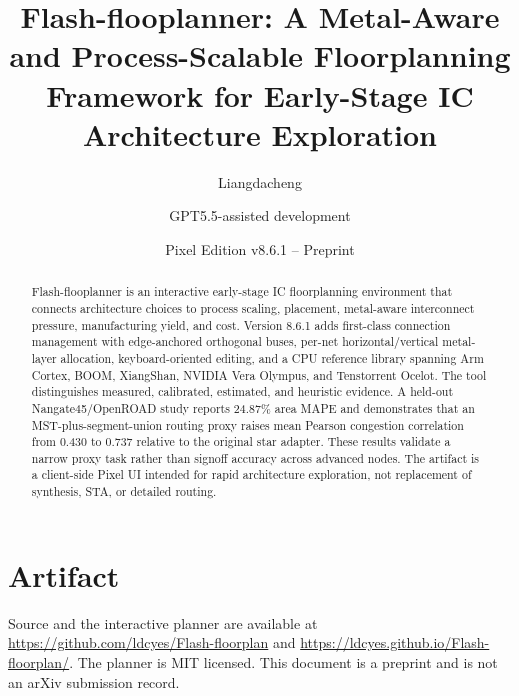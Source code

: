 \documentclass[10pt,twocolumn]{article}
\title{Flash-flooplanner: A Metal-Aware and Process-Scalable Floorplanning Framework for Early-Stage IC Architecture Exploration}
\author{Liangdacheng \and GPT5.5-assisted development}
\date{Pixel Edition v8.6.1 -- Preprint}
\begin{document}
\maketitle
\begin{abstract}
Flash-flooplanner is an interactive early-stage IC floorplanning environment that connects architecture choices to process scaling, placement, metal-aware interconnect pressure, manufacturing yield, and cost. Version 8.6.1 adds first-class connection management with edge-anchored orthogonal buses, per-net horizontal/vertical metal-layer allocation, keyboard-oriented editing, and a CPU reference library spanning Arm Cortex, BOOM, XiangShan, NVIDIA Vera Olympus, and Tenstorrent Ocelot. The tool distinguishes measured, calibrated, estimated, and heuristic evidence. A held-out Nangate45/OpenROAD study reports 24.87\% area MAPE and demonstrates that an MST-plus-segment-union routing proxy raises mean Pearson congestion correlation from 0.430 to 0.737 relative to the original star adapter. These results validate a narrow proxy task rather than signoff accuracy across advanced nodes. The artifact is a client-side Pixel UI intended for rapid architecture exploration, not replacement of synthesis, STA, or detailed routing.
\end{abstract}






\section*{Artifact}
Source and the interactive planner are available at \url{https://github.com/ldcyes/Flash-floorplan} and \url{https://ldcyes.github.io/Flash-floorplan/}. The planner is MIT licensed. This document is a preprint and is not an arXiv submission record.
\end{document}
